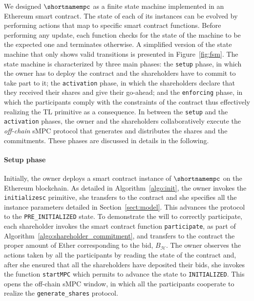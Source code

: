 We designed $\shortnamempc$ as a finite state machine implemented in an Ethereum smart contract.
The state of each of its instances can be evolved by performing actions that map to specific smart contract functions.
Before performing any update, each function checks for the state of the machine to be the expected one and terminates otherwise.
A simplified version of the state machine that only shows valid transitions is presented in Figure~\ref{fig:fsm}.
The state machine is characterized by three main phases: the \texttt{setup} phase, in which the owner has to deploy the contract and the shareholders have to commit to take part to it; the \texttt{activation} phase, in which the shareholders declare that they received their shares and give their go-ahead; and the \texttt{enforcing} phase, in which the participants comply with the constraints of the contract thus effectively realizing the TL primitive as a consequence.
%
%
In between the \texttt{setup} and the \texttt{activation} phases, the owner and the shareholders collaboratively execute the {\em off-chain} sMPC protocol that generates and distributes the shares and the commitments.
These phases are discussed in details in the following.

\medskip

\paragraph*{Setup phase}
Initially, the owner deploys a smart contract instance of $\shortnamempc$ on the Ethereum blockchain.
As detailed in Algorithm~\ref{algo:init}, the owner invokes the \texttt{initialize\textunderscore sc} primitive, she transfers \PO to the contract and she specifies all the instance parameters detailed in Section~\ref{sect:model}.
This advances the protocol to the \texttt{PRE\_INITIALIZED} state. 
To demonstrate the will to correctly participate, each shareholder invokes the smart contract function \texttt{participate}, as part of Algorithm~\ref{algo:shareholder_commitment}, and transfers to the contract the proper amount of Ether corresponding to the bid, $B_{\mathcal{H}}$. 
The owner observes the actions taken by all the participants by reading the state of the contract and, after she ensured that all the shareholders have deposited their bids, she invokes the function \texttt{startMPC} which permits to advance the state to \texttt{INITIALIZED}.
This opens the off-chain sMPC window, in which all the participants cooperate to realize the \texttt{generate\_shares} protocol.

